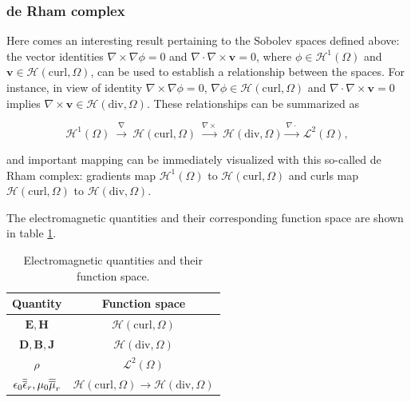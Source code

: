 \subsubsection{de Rham complex}
%
Here comes an interesting result pertaining to the Sobolev spaces defined above: the vector identities $\nabla \times \nabla \phi = 0$ and $\nabla \cdot \nabla \times \mathbf{v} = 0$, where $\phi \in \mathcal{H}^1(\Omega)$ and $\mathbf{v} \in \mathcal{H}(\mathrm{curl},\Omega)$, can be used to establish a relationship between the spaces. For instance, in view of identity $\nabla \times \nabla \phi = 0$, $\nabla \phi \in \mathcal{H}(\mathrm{curl},\Omega)$ and $\nabla \cdot \nabla \times \mathbf{v} = 0$ implies $\nabla \times \mathbf{v} \in \mathcal{H}(\mathrm{div},\Omega)$. These relationships can be summarized as

$$\mathcal{H}^1(\Omega) \ \stackrel{\nabla}{  \longrightarrow} \ \mathcal{H}(\mathrm{curl},\Omega) \ \stackrel{ \nabla\times}{ \longrightarrow} \ \mathcal{H}(\mathrm{div},\Omega) \stackrel{\nabla\cdot}{ \longrightarrow} \ \mathcal{L}^2(\Omega),$$

\noindent and important mapping can be immediately visualized with this so-called de Rham complex: gradients map $\mathcal{H}^1(\Omega)$ to $\mathcal{H}(\mathrm{curl},\Omega)$ and curls map $\mathcal{H}(\mathrm{curl},\Omega)$ to $\mathcal{H}(\mathrm{div},\Omega)$. 

The electromagnetic quantities and their corresponding function space are shown in table \ref{tab:quantspace}.


\begin{table}[h!]
\begin{center}
\begin{tabular}{|c|c|}
\hline 
Quantity & Function space \\ 
\hline
\hline 
$\mathbf{E}, \mathbf{H}$ & $\mathcal{H}(\mathrm{curl},\Omega)$ \\ 
\hline 
$\mathbf{D}, \mathbf{B}, \mathbf{J}$ & $\mathcal{H}(\mathrm{div},\Omega)$ \\ 
\hline 
$\rho$ & $\mathcal{L}^2(\Omega)$ \\ 
\hline 
$\epsilon_0 \overline{\overline{\epsilon}}_r, \mu_0 \overline{\overline{\mu}}_r$ & $\mathcal{H}(\mathrm{curl},\Omega) \longrightarrow \mathcal{H}(\mathrm{div},\Omega)$ \\ 
\hline 
\end{tabular}
\end{center}
\caption{Electromagnetic quantities and their function space.}
\label{tab:quantspace}
\end{table}

